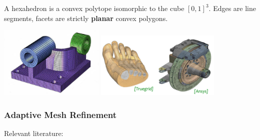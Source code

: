 A hexahedron is a convex polytope isomorphic to the cube $[0,1]^3$.
Edges are line segments, facets are strictly {\bf planar} convex polygons.

\begin{center}
\includegraphics[width=5cm]{images/meshes/hexa.jpg}
\includegraphics[width=6cm]{images/meshes/hexa2}
\end{center}




\subsubsection{Adaptive Mesh Refinement}
 

Relevant literature: \cite{bugg10}\cite{beck10}



